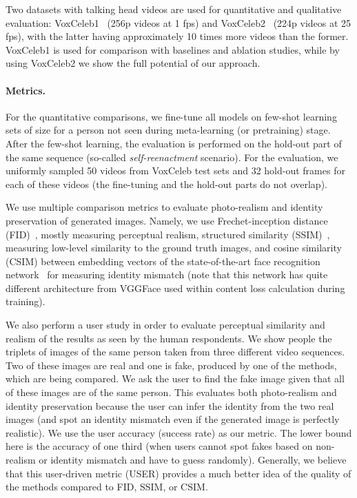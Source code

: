 \documentclass[10pt,twocolumn,letterpaper]{article}
\begin{document}
Two datasets with talking head videos are used for quantitative and qualitative evaluation: VoxCeleb1~\cite{Nagrani17} (256p videos at 1 fps) and VoxCeleb2~\cite{Chung18} (224p videos at 25 fps), with the latter having approximately 10 times more videos than the former. VoxCeleb1 is used for comparison with baselines and ablation studies, while by using VoxCeleb2 we show the full potential of our approach. 

\paragraph{Metrics.}

For the quantitative comparisons, we fine-tune all models on few-shot learning sets of size  for a person not seen during meta-learning (or pretraining) stage. After the few-shot learning, the evaluation is performed on the hold-out part of the same sequence (so-called \textit{self-reenactment} scenario). For the evaluation, we uniformly sampled 50 videos from VoxCeleb test sets and 32 hold-out frames for each of these videos (the fine-tuning and the hold-out parts do not overlap).

We use multiple comparison metrics to evaluate photo-realism and identity preservation of generated images. Namely, we use Frechet-inception distance (FID)~\cite{Guyon17}, mostly measuring perceptual realism, structured similarity (SSIM)~\cite{Wang04}, measuring low-level similarity to the ground truth images, and cosine similarity (CSIM) between embedding vectors of the state-of-the-art face recognition network~\cite{Deng19} for measuring identity mismatch (note that this network has quite different architecture from VGGFace used within content loss calculation during training).

We also perform a user study in order to evaluate perceptual similarity and realism of the results as seen by the human respondents. We show people the triplets of images of the same person taken from three different video sequences. Two of these images are real and one is fake, produced by one of the methods, which are being compared. We ask the user to find the fake image given that all of these images are of the same person. This evaluates both photo-realism and identity preservation because the user can infer the identity from the two real images (and spot an identity mismatch even if the generated image is perfectly realistic). We use the user accuracy (success rate) as our metric. The lower bound here is the accuracy of one third (when users cannot spot fakes based on non-realism or identity mismatch and have to guess randomly). Generally, we believe that this user-driven metric (USER) provides a much better idea of the quality of the methods compared to FID, SSIM, or CSIM.
\end{document}
